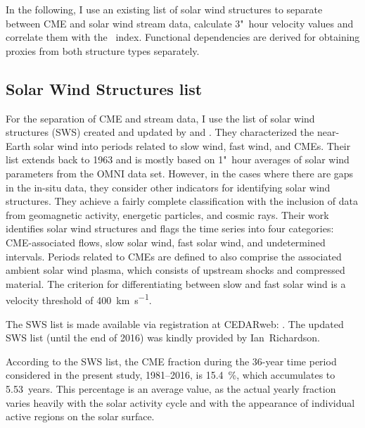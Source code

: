In the following, I use an existing list of solar wind structures to separate between CME and solar wind stream data, calculate 3"~hour velocity values and correlate them with the \Kp~index. Functional dependencies are derived for obtaining \Kp{} proxies from both structure types separately.


\subsection{Solar Wind Structures list}
For the separation of CME and stream data, I use the list of solar wind structures (SWS) created and updated by \citet{Richardson2000} and \citet{Richardson2012}. They characterized the near-Earth solar wind into periods related to slow wind, fast wind, and CMEs. Their list extends back to 1963 and is mostly based on 1"~hour averages of solar wind parameters from the OMNI data set. However, in the cases where there are gaps in the in-situ data, they consider other indicators for identifying solar wind structures. They achieve a fairly complete classification with the inclusion of data from geomagnetic activity, energetic particles, and cosmic rays.
Their work identifies solar wind structures and flags the time series into four categories: CME-associated flows, slow solar wind, fast solar wind, and undetermined intervals. Periods related to CMEs are defined to also comprise the associated ambient solar wind plasma, which consists of upstream shocks and compressed material. The criterion for differentiating between slow and fast solar wind is a velocity threshold of \SI{400}{\km\per\s}.

The SWS list is made available via registration at CEDARweb: .
The updated SWS list (until the end of 2016) was kindly provided by Ian~Richardson.

According to the SWS list, the CME fraction during the 36-year time period considered in the present study, 1981--2016, is \SI{15.4}{\%}, which accumulates to 5.53~years. %
This percentage is an average value, as the actual yearly fraction varies heavily with the solar activity cycle and with the appearance of individual active regions on the solar surface.

